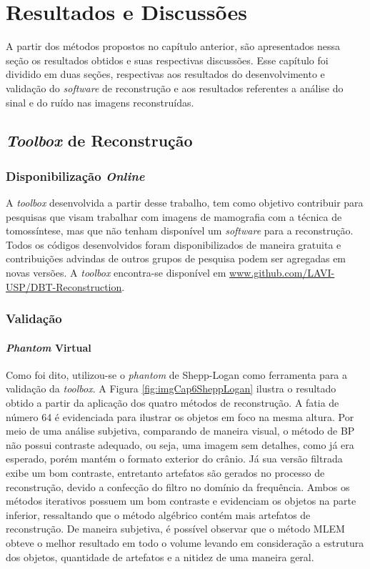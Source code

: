 \chapter[Resultados e Discussões]{Resultados e Discussões}\label{Capitulo6}

A partir dos métodos propostos no capítulo anterior, são apresentados nessa seção os resultados obtidos e suas respectivas discussões. Esse capítulo foi dividido em duas seções, respectivas aos resultados do desenvolvimento e validação do \textit{software} de reconstrução e aos resultados referentes a análise do sinal e do ruído nas imagens reconstruídas. 

\section{\textit{Toolbox} de Reconstrução}

\subsection{Disponibilização \textit{Online}}

 A \textit{toolbox} desenvolvida a partir desse trabalho, tem como objetivo contribuir para pesquisas que visam trabalhar com imagens de mamografia com a técnica de tomossíntese, mas que não tenham disponível um \textit{software} para a reconstrução. Todos os códigos desenvolvidos foram disponibilizados de maneira gratuita e contribuições advindas de outros grupos de pesquisa podem ser agregadas em novas versões. A \textit{toolbox} encontra-se disponível em \url{www.github.com/LAVI-USP/DBT-Reconstruction}. 
 
 \subsection{Validação}
 
 \subsubsection{\textit{Phantom} Virtual}
 
 Como foi dito, utilizou-se o \textit{phantom} de Shepp-Logan como ferramenta para a validação da \textit{toolbox}. A Figura \ref{fig:imgCap6SheppLogan} ilustra o resultado obtido a partir da aplicação dos quatro métodos de reconstrução. A fatia de número 64 é evidenciada para ilustrar os objetos em foco na mesma altura. Por meio de uma análise subjetiva, comparando de maneira visual, o método de \acs{BP} não possui contraste adequado, ou seja, uma imagem sem detalhes, como já era esperado, porém mantém o formato exterior do crânio. Já sua versão filtrada exibe um bom contraste, entretanto artefatos são gerados no processo de reconstrução, devido a confecção do filtro no domínio da frequência. Ambos os métodos iterativos possuem um bom contraste e evidenciam os objetos na parte inferior, ressaltando que o método algébrico contém mais artefatos de reconstrução. De maneira subjetiva,  é possível observar que o método \acs{MLEM} obteve o melhor resultado em todo o volume levando em consideração a estrutura dos objetos, quantidade de artefatos e a nitidez de uma maneira geral.
 
